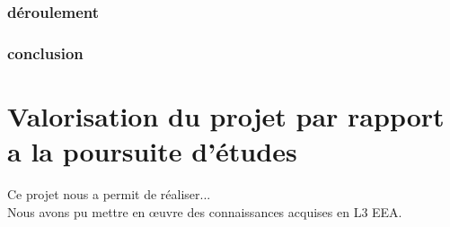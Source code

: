 \documentclass[a4paper]{report}
\begin{document}
	\subsection{déroulement}
	\subsection{conclusion}
	

	\chapter{Valorisation du projet par rapport a la poursuite d'études}
	
		Ce projet nous a permit de réaliser... \\
		Nous avons pu mettre en œuvre des connaissances acquises en L3 EEA.\\
	
 
\end{document}
